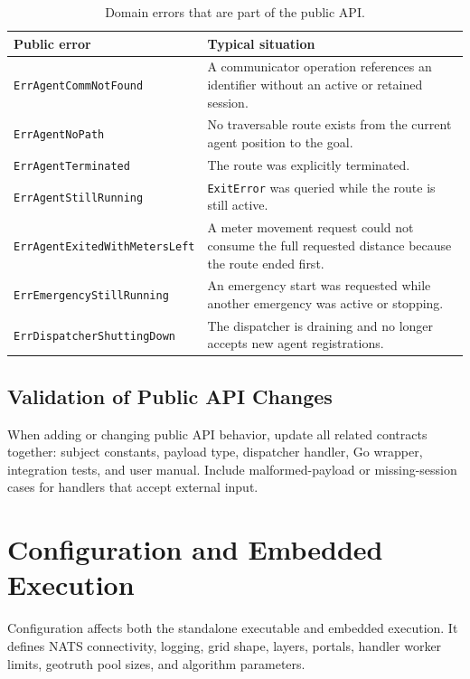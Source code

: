 \documentclass[12pt,a4paper]{report}
\begin{document}
\begin{table}[H]
\centering
\begin{tabular}{|p{}|p{}|}
\hline
\textbf{Public error} & \textbf{Typical situation} \\
\hline
\texttt{ErrAgentCommNotFound} &
A communicator operation references an identifier without an active or retained
session. \\
\hline
\texttt{ErrAgentNoPath} &
No traversable route exists from the current agent position to the goal. \\
\hline
\texttt{ErrAgentTerminated} &
The route was explicitly terminated. \\
\hline
\texttt{ErrAgentStillRunning} &
\texttt{ExitError} was queried while the route is still active. \\
\hline
\texttt{ErrAgentExitedWithMetersLeft} &
A meter movement request could not consume the full requested distance because
the route ended first. \\
\hline
\texttt{ErrEmergencyStillRunning} &
An emergency start was requested while another emergency was active or stopping. \\
\hline
\texttt{ErrDispatcherShuttingDown} &
The dispatcher is draining and no longer accepts new agent registrations. \\
\hline
\end{tabular}
\caption{Domain errors that are part of the public API.}
\end{table}

\subsection{Validation of Public API Changes}

When adding or changing public API behavior, update all related contracts
together: subject constants, payload type, dispatcher handler, Go wrapper,
integration tests, and user manual. Include malformed-payload or missing-session
cases for handlers that accept external input.

\section{Configuration and Embedded Execution}

Configuration affects both the standalone executable and embedded execution. It
defines NATS connectivity, logging, grid shape, layers, portals, handler worker
limits, geotruth pool sizes, and algorithm parameters.
\end{document}
